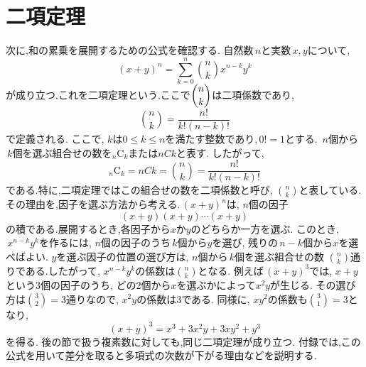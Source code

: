 
  \section{二項定理}
    次に,和の累乗を展開するための公式を確認する.
    自然数$\,n$と実数$\,x,y$について,
    \[
      (x+y)^n=\sum_{k=0}^{n}\binom{n}{k}x^{n-k}y^{k}
    \]
    が成り立つ.これを二項定理という.ここで$\dbinom{n}{k}$は二項係数であり,
    \[
      \binom{n}{k}=\frac{n!}{k!(n-k)!}
    \]
    で定義される. ここで,\,$\,k$は$0\le k\le n$を満たす整数であり,\,$0!=1$とする.
    $\,n$個から$\,k$個を選ぶ組合せの数を${}_n\mathrm{C}_k$または$nCk$と表す.
    したがって,
    \[
      {}_n\mathrm{C}_k=nCk=\binom{n}{k}
      =\frac{n!}{k!(n-k)!}
    \]
    である.特に,二項定理ではこの組合せの数を二項係数と呼び,
    $\binom{n}{k}$と表している.
    その理由を,因子を選ぶ方法から考える.\,$(x+y)^n$は,\,$\,n$個の因子
    \[
      (x+y)(x+y)\cdots(x+y)
    \]
    の積である.展開するとき,各因子から$x$か$y$のどちらか一方を選ぶ.
    このとき,\,$\,x^{n-k}y^k$を作るには,\,$\,n$個の因子のうち$\,k$個から$y$を選び,
    残りの$\,n-k$個から$x$を選べばよい.
    $y$を選ぶ因子の位置の選び方は,\,$\,n$個から$\,k$個を選ぶ組合せの数
    $\binom{n}{k}$通りである.したがって,\,$\,x^{n-k}y^k$の係数は$\binom{n}{k}$となる.
    例えば$\,(x+y)^3$では,\,$\,x+y$という3個の因子のうち,
    どの2個から$x$を選ぶかによって$x^2y$が生じる.
    その選び方は$\binom{3}{2}=3$通りなので,\,$\,x^2y$の係数は$3$である.
    同様に,\,$\,xy^2$の係数も$\binom{3}{1}=3$となり,
    \[
      (x+y)^3=x^3+3x^2y+3xy^2+y^3
    \]
    を得る.
    後の節で扱う複素数に対しても,同じ二項定理が成り立つ.
    付録では,この公式を用いて差分を取ると多項式の次数が下がる理由などを説明する.
